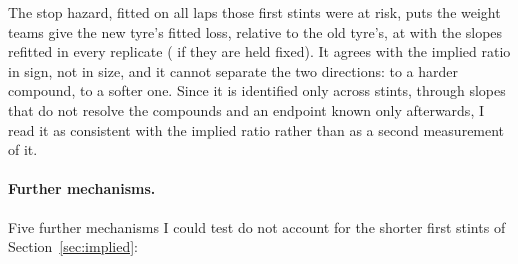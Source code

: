 \documentclass[11pt,a4paper]{article}
\begin{document}
The stop hazard, fitted on all \HazardLaps{} laps those \HazardStints{} first
stints were at risk, puts the weight teams give the new tyre's fitted loss,
relative to the old tyre's, at \HazardRatio{} \HazardRatioCi{} with the slopes
refitted in every replicate (\HazardRatioCiFixed{} if they are held fixed). It
agrees with the implied ratio in sign, not in size, and it cannot separate the
two directions: \HazardHarder{} \HazardHarderCi{} to a harder compound,
\HazardSofter{} \HazardSofterCi{} to a softer one. Since it is identified only
across stints, through slopes that do not resolve the compounds and an endpoint
known only afterwards, I read it as consistent with the implied ratio rather
than as a second measurement of it.

\paragraph{Further mechanisms.} Five further mechanisms I could test do not account for the shorter first
stints of Section~\ref{sec:implied}:
\end{document}
